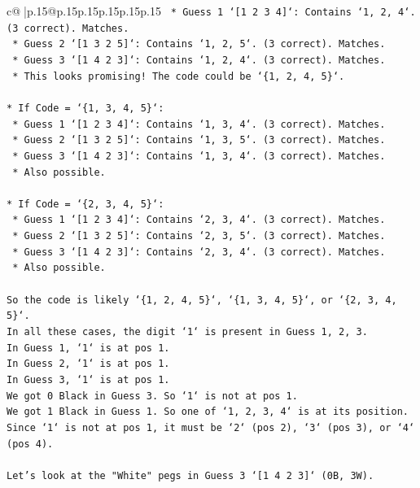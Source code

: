 \documentclass{article}
\begin{document}
{\begin{supertabular}{c@{$\;$}|p{.15\linewidth}@{}p{.15\linewidth}p{.15\linewidth}p{.15\linewidth}p{.15\linewidth}p{.15\linewidth}}
{{{\texttt{    *   Guess 1 `{[}1 2 3 4{]}`: Contains `1, 2, 4`. (3 correct). Matches.} \\
\texttt{    *   Guess 2 `{[}1 3 2 5{]}`: Contains `1, 2, 5`. (3 correct). Matches.} \\
\texttt{    *   Guess 3 `{[}1 4 2 3{]}`: Contains `1, 2, 4`. (3 correct). Matches.} \\
\texttt{    *   This looks promising! The code could be `\{1, 2, 4, 5\}`.} \\
\\ 
\texttt{*   If Code = `\{1, 3, 4, 5\}`:} \\
\texttt{    *   Guess 1 `{[}1 2 3 4{]}`: Contains `1, 3, 4`. (3 correct). Matches.} \\
\texttt{    *   Guess 2 `{[}1 3 2 5{]}`: Contains `1, 3, 5`. (3 correct). Matches.} \\
\texttt{    *   Guess 3 `{[}1 4 2 3{]}`: Contains `1, 3, 4`. (3 correct). Matches.} \\
\texttt{    *   Also possible.} \\
\\ 
\texttt{*   If Code = `\{2, 3, 4, 5\}`:} \\
\texttt{    *   Guess 1 `{[}1 2 3 4{]}`: Contains `2, 3, 4`. (3 correct). Matches.} \\
\texttt{    *   Guess 2 `{[}1 3 2 5{]}`: Contains `2, 3, 5`. (3 correct). Matches.} \\
\texttt{    *   Guess 3 `{[}1 4 2 3{]}`: Contains `2, 3, 4`. (3 correct). Matches.} \\
\texttt{    *   Also possible.} \\
\\ 
\texttt{So the code is likely `\{1, 2, 4, 5\}`, `\{1, 3, 4, 5\}`, or `\{2, 3, 4, 5\}`.} \\
\texttt{In all these cases, the digit `1` is present in Guess 1, 2, 3.} \\
\texttt{In Guess 1, `1` is at pos 1.} \\
\texttt{In Guess 2, `1` is at pos 1.} \\
\texttt{In Guess 3, `1` is at pos 1.} \\
\texttt{We got 0 Black in Guess 3. So `1` is not at pos 1.} \\
\texttt{We got 1 Black in Guess 1. So one of `1, 2, 3, 4` is at its position. Since `1` is not at pos 1, it must be `2` (pos 2), `3` (pos 3), or `4` (pos 4).} \\
\\ 
\texttt{Let's look at the "White" pegs in Guess 3 `{[}1 4 2 3{]}` (0B, 3W).} \\
}}}
\end{supertabular}}
\end{document}
